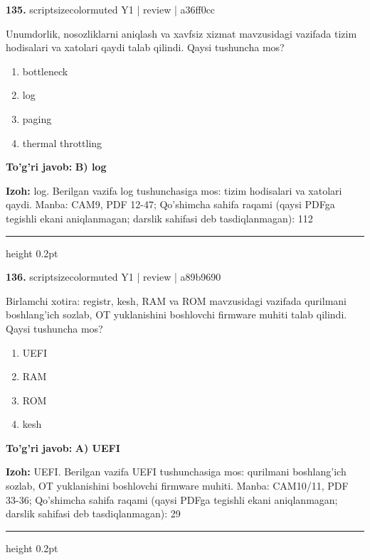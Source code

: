 \documentclass[10pt,a4paper]{article}
\begin{document}
{\bfseries\sffamily\color{ink} 135.} {scriptsizecolor{muted} Y1 | review | a36ff0cc}
\par
Unumdorlik, nosozliklarni aniqlash va xavfsiz xizmat mavzusidagi vazifada tizim hodisalari va xatolari qaydi talab qilindi. Qaysi tushuncha mos?
\begin{enumerate}[label=\Alph*),leftmargin=9mm]
\item bottleneck
\item log
\item paging
\item thermal throttling
\end{enumerate}
\begin{tcolorbox}[enhanced,breakable,colback=teal!4,colframe=teal!60!black,boxrule=0.45pt,arc=1.2mm,left=2.7mm,right=2.7mm,top=1.8mm,bottom=1.8mm,before skip=2mm,after skip=2mm]
{\bfseries\sffamily\color{teal}To'g'ri javob:} \textbf{B) log}
\par\smallskip
{\bfseries Izoh:} log. Berilgan vazifa log tushunchasiga mos: tizim hodisalari va xatolari qaydi. Manba: CAM9, PDF 12-47; Qo'shimcha sahifa raqami (qaysi PDFga tegishli ekani aniqlanmagan; darslik sahifasi deb tasdiqlanmagan): 112
\end{tcolorbox}
\vspace{2mm}\hrule height 0.2pt\vspace{3mm}

{\bfseries\sffamily\color{ink} 136.} {scriptsizecolor{muted} Y1 | review | a89b9690}
\par
Birlamchi xotira: registr, kesh, RAM va ROM mavzusidagi vazifada qurilmani boshlang'ich sozlab, OT yuklanishini boshlovchi firmware muhiti talab qilindi. Qaysi tushuncha mos?
\begin{enumerate}[label=\Alph*),leftmargin=9mm]
\item UEFI
\item RAM
\item ROM
\item kesh
\end{enumerate}
\begin{tcolorbox}[enhanced,breakable,colback=teal!4,colframe=teal!60!black,boxrule=0.45pt,arc=1.2mm,left=2.7mm,right=2.7mm,top=1.8mm,bottom=1.8mm,before skip=2mm,after skip=2mm]
{\bfseries\sffamily\color{teal}To'g'ri javob:} \textbf{A) UEFI}
\par\smallskip
{\bfseries Izoh:} UEFI. Berilgan vazifa UEFI tushunchasiga mos: qurilmani boshlang'ich sozlab, OT yuklanishini boshlovchi firmware muhiti. Manba: CAM10/11, PDF 33-36; Qo'shimcha sahifa raqami (qaysi PDFga tegishli ekani aniqlanmagan; darslik sahifasi deb tasdiqlanmagan): 29
\end{tcolorbox}
\vspace{2mm}\hrule height 0.2pt\vspace{3mm}
\end{document}
